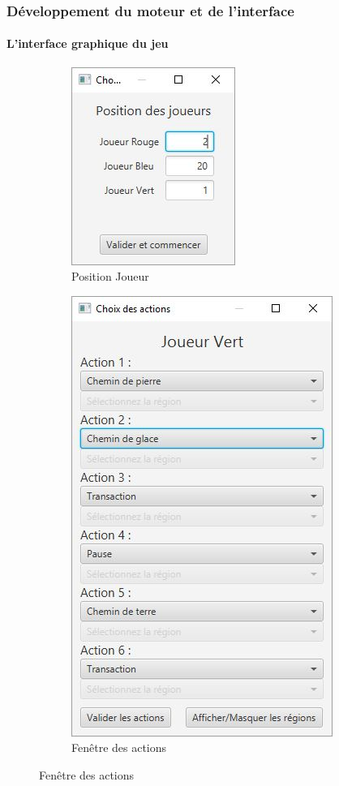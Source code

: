 	\begin{frame}
		\frametitle{Développement du moteur et de l'interface}
		\framesubtitle{L'interface graphique du jeu}
		\begin{figure}
			\begin{subfigure}{0.5\textwidth}
				\centering
				\includegraphics[width=0.4\linewidth]{images/position}
				\caption{Position Joueur}
				\label{fig:position}
			\end{subfigure}
			\begin{subfigure}{0.4\textwidth}
				\centering
				\includegraphics[width=0.5\linewidth]{images/actions}
				\caption{Fenêtre des actions}
				\label{fig:actions}
			\end{subfigure}
		\end{figure}
	\end{frame}

